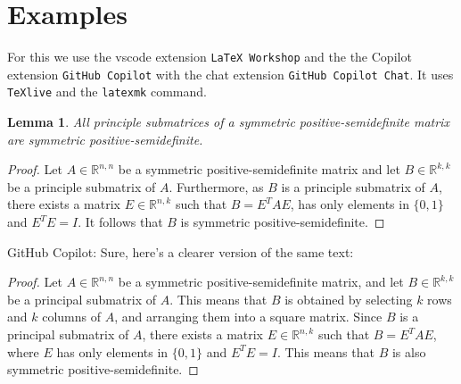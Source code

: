 \documentclass[12pt]{article}
\newcommand{\R}{\mathbb{R}}
\newtheorem{lemma}{Lemma}
\begin{document}
\section{Examples}

For this we use the vscode extension \texttt{LaTeX Workshop} 
and the the Copilot extension \texttt{GitHub Copilot} with 
the chat extension \texttt{GitHub Copilot Chat}.
It uses \texttt{TeXlive} and the \texttt{latexmk} command.


\begin{lemma}
    All principle submatrices of a 
    symmetric positive-semidefinite matrix are
    symmetric positive-semidefinite.
\end{lemma}

\begin{proof}
    Let $A\in \R^{n,n}$ be a symmetric positive-semidefinite matrix and 
    let $B\in\R^{k,k}$ be a principle submatrix of $A$. 
    Furthermore, as $B$ is a principle submatrix of $A$, there exists
    a matrix $E\in\R^{n,k}$ such that $B = E^T A E$, 
    has only elements in $\{0,1\}$ and $E^T E=I$.
    It follows that $B$ is symmetric positive-semidefinite.
\end{proof}

GitHub Copilot: Sure, here's a clearer version of the same text:

\begin{proof}
Let $A\in \R^{n,n}$ be a symmetric positive-semidefinite matrix, 
and let $B\in\R^{k,k}$ be a principal submatrix of $A$. This 
means that $B$ is obtained by selecting $k$ rows and $k$ columns 
of $A$, and arranging them into a square matrix. Since $B$ is 
a principal submatrix of $A$, there exists a matrix 
$E\in\R^{n,k}$ such that $B = E^T A E$, where $E$ has only 
elements in $\{0,1\}$ and $E^T E=I$. This means that $B$ is 
also symmetric positive-semidefinite.
\end{proof}
\end{document}
